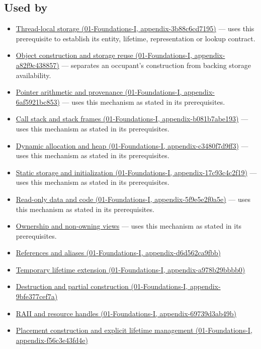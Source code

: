 \subsection{Used by}\label{appendix-0b104bcba06b-used-by}

\begin{itemize}
\tightlist
\item
  \href{../01-Foundations-I/main.pdf\#nameddest=appendix-3b88c6cd7195}{Thread-local storage (01-Foundations-I, appendix-3b88c6cd7195)} --- uses this prerequisite to establish its entity, lifetime, representation or lookup contract.
\item
  \href{../01-Foundations-I/main.pdf\#nameddest=appendix-a82f9c438857}{Object construction and storage reuse (01-Foundations-I, appendix-a82f9c438857)} --- separates an occupant's construction from backing storage availability.
\item
  \href{../01-Foundations-I/main.pdf\#nameddest=appendix-6af5921bc853}{Pointer arithmetic and provenance (01-Foundations-I, appendix-6af5921bc853)} --- uses this mechanism as stated in its prerequisites.
\item
  \href{../01-Foundations-I/main.pdf\#nameddest=appendix-b081b7abe193}{Call stack and stack frames (01-Foundations-I, appendix-b081b7abe193)} --- uses this mechanism as stated in its prerequisites.
\item
  \href{../01-Foundations-I/main.pdf\#nameddest=appendix-c3480f7d9ff3}{Dynamic allocation and heap (01-Foundations-I, appendix-c3480f7d9ff3)} --- uses this mechanism as stated in its prerequisites.
\item
  \href{../01-Foundations-I/main.pdf\#nameddest=appendix-17c93c4c2f19}{Static storage and initialization (01-Foundations-I, appendix-17c93c4c2f19)} --- uses this mechanism as stated in its prerequisites.
\item
  \href{../01-Foundations-I/main.pdf\#nameddest=appendix-5f9e5e2f0a5e}{Read-only data and code (01-Foundations-I, appendix-5f9e5e2f0a5e)} --- uses this mechanism as stated in its prerequisites.
\item
  \hyperref[appendix-d52e4486f527]{Ownership and non-owning views} --- uses this mechanism as stated in its prerequisites.
\item
  \href{../01-Foundations-I/main.pdf\#nameddest=appendix-d6d562ca9fbb}{References and aliases (01-Foundations-I, appendix-d6d562ca9fbb)}
\item
  \href{../01-Foundations-I/main.pdf\#nameddest=appendix-a978b29bbbb0}{Temporary lifetime extension (01-Foundations-I, appendix-a978b29bbbb0)}
\item
  \href{../01-Foundations-I/main.pdf\#nameddest=appendix-9bfe377cef7a}{Destruction and partial construction (01-Foundations-I, appendix-9bfe377cef7a)}
\item
  \href{../01-Foundations-I/main.pdf\#nameddest=appendix-69739d3ab49b}{RAII and resource handles (01-Foundations-I, appendix-69739d3ab49b)}
\item
  \href{../01-Foundations-I/main.pdf\#nameddest=appendix-f56c3e43fd4e}{Placement construction and explicit lifetime management (01-Foundations-I, appendix-f56c3e43fd4e)}
\end{itemize}

